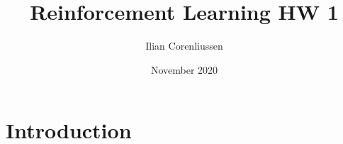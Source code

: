 \documentclass{article}
\title{Reinforcement Learning HW 1}
\author{Ilian Corenliussen}
\date{November 2020}
\begin{document}
\maketitle

\section{Introduction}
\end{document}
